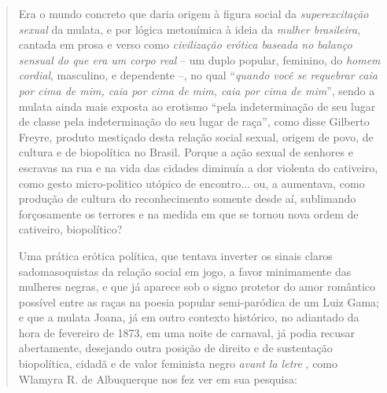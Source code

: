 \begin{quote}
Era o mundo concreto que daria origem à figura social da
\emph{superexcitação sexual} da mulata, e por lógica metonímica à ideia
da \emph{mulher brasileira}, cantada em prosa e verso como
\emph{civilização erótica baseada no balanço sensual do que era um corpo
real} -- um duplo popular, feminino, do \emph{homem} \emph{cordial},
masculino, e dependente --, no qual ``\emph{quando você se requebrar
caia por cima de mim, caia por cima de mim, caia por cima de mim}'',
sendo a mulata ainda mais exposta ao erotismo ``pela indeterminação de
seu lugar de classe pela indeterminação do seu lugar de raça'', como
disse Gilberto Freyre, produto mestiçado desta relação social sexual,
origem de povo, de cultura e de biopolítica no Brasil. Porque a ação
sexual de senhores e escravas na rua e na vida das cidades diminuía a
dor violenta do cativeiro, como gesto micro-politico utópico de
encontro... ou, a aumentava, como produção de cultura do reconhecimento
somente desde aí, sublimando forçosamente os terrores e na medida em que
se tornou nova ordem de cativeiro, biopolítico?

Uma prática erótica política, que tentava inverter os sinais claros
sadomasoquistas da relação social em jogo, a favor minimamente das
mulheres negras, e que já aparece sob o signo protetor do amor romântico
possível entre as raças na poesia popular semi-paródica de um Luiz Gama;
e que a mulata Joana, já em outro contexto histórico, no adiantado da
hora de fevereiro de 1873, em uma noite de carnaval, já podia recusar
abertamente, desejando outra posição de direito e de sustentação
biopolítica, cidadã e de valor feminista negro \emph{avant la letre} ,
como Wlamyra R. de Albuquerque nos fez ver em sua pesquisa:


\end{quote}
